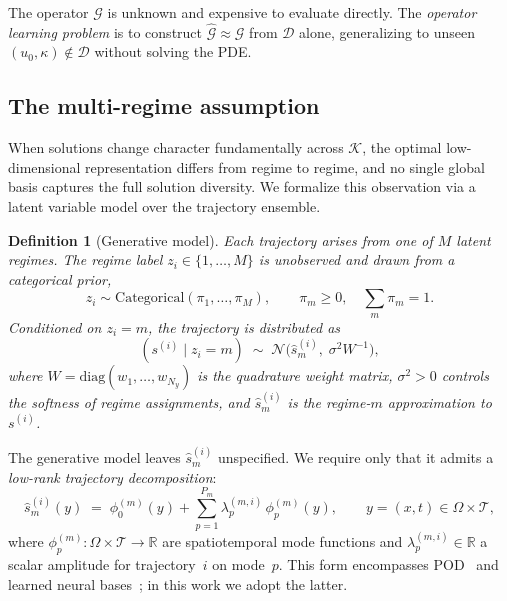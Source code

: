 \documentclass{article}
\newtheorem{definition}{Definition}
\newcommand{\cN}{\mathcal{N}}
\newcommand{\cK}{\mathcal{K}}
\newcommand{\cD}{\mathcal{D}}
\newcommand{\hats}{\hat{s}}
\newcommand{\cG}{\mathcal{G}}
\begin{document}
The operator $\cG$ is unknown and expensive to evaluate directly. The \emph{operator learning problem} is to construct $\hat{\cG} \approx \cG$ from $\cD$ alone, generalizing to unseen $(u_0,\kappa) \notin \cD$ without solving the PDE.





\subsection*{The multi-regime assumption}

When solutions change character fundamentally across $\cK$, the optimal low-dimensional representation differs from regime to regime, and no single global basis captures the full solution diversity. We formalize this observation via a latent variable model over the trajectory ensemble.

\begin{definition}[Generative model]
\label{def:generative}
Each trajectory arises from one of $M$ latent regimes. The regime label $z_i \in \{1,\ldots,M\}$ is unobserved and drawn from a categorical prior,
\begin{equation}
  z_i \sim \mathrm{Categorical}(\pi_1,\ldots,\pi_M),
  \qquad \pi_m \geq 0,\quad \textstyle\sum_m \pi_m = 1.
  \label{eq:prior}
\end{equation}
Conditioned on $z_i = m$, the trajectory is distributed as
\begin{equation}
 ( s^{(i)} \mid z_i{=}m) \;\sim\;
  \cN\!\bigl(\hats_m^{(i)},\;\sigma^2 W^{-1}\bigr),
  \label{eq:likelihood}
\end{equation}
where $W = \mathrm{diag}(w_1,\ldots,w_{N_y})$ is the quadrature weight matrix, $\sigma^2 > 0$ controls the softness of regime assignments, and $\hats_m^{(i)}$ is the regime-$m$ approximation to $s^{(i)}$.
\end{definition}


The generative model leaves $\hats_m^{(i)}$ unspecified. We require only that it admits a \emph{low-rank trajectory decomposition}:
\begin{equation}
  \hats_m^{(i)}(y)
  \;=\; \phi_0^{(m)}(y)
  + \sum_{p=1}^{P_m}
    \lambda_p^{(m,i)}\,\phi_p^{(m)}(y),
  \qquad y = (x,t) \in \Omega\times\mathcal{T},
  \label{eq:separable}
\end{equation}
where $\phi_p^{(m)} : \Omega\times\mathcal{T}\to\mathbb{R}$ are spatiotemporal
mode functions and $\lambda_p^{(m,i)} \in \mathbb{R}$ a scalar amplitude
for trajectory~$i$ on mode~$p$.
This form encompasses POD~\citep{Lu2022} and learned neural bases~\citep{Mou2026};
in this work we adopt the latter.
\end{document}

